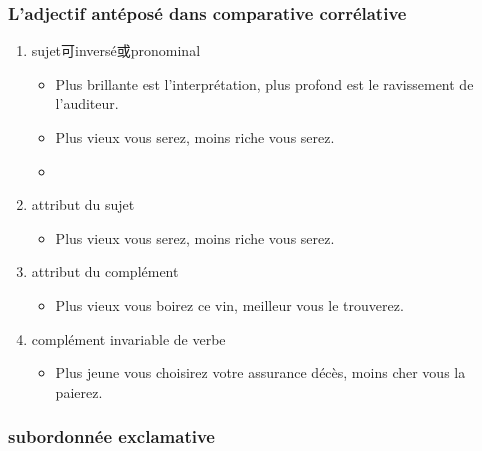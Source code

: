 \documentclass[UTF8]{report}
\begin{document}
\subsubsection{L’adjectif antéposé dans  comparative corrélative}
\begin{enumerate}
    \item sujet可inversé或pronominal
    \begin{itemize}
        \item Plus brillante est l’interprétation, plus profond est le ravissement de l’auditeur.
        \item Plus vieux vous serez, moins riche vous serez.
        \item 
    \end{itemize}
    \item attribut du sujet
    \begin{itemize}
        \item Plus vieux vous serez, moins riche vous serez.
    \end{itemize}
    \item attribut du complément 
    \begin{itemize}
        \item Plus vieux vous boirez ce vin, meilleur vous le trouverez.
    \end{itemize}
    \item complément invariable de verbe
    \begin{itemize}
        \item Plus jeune vous choisirez votre assurance décès, moins cher vous la paierez.
    \end{itemize}
\end{enumerate}



\subsubsection{subordonnée exclamative}
\end{document}
